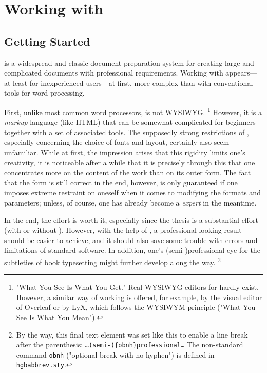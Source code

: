 \chapter{Working with \latex}
\label{cha:WorkingWithLatex}


\section{Getting Started}
\label{sec:LatexGettingStarted}

\latex is a widespread and classic document preparation system for creating
large and complicated documents with professional requirements. Working with
\latex appears---at least for inexperienced users---at first, more complex
than with conventional tools for word processing.

First, unlike most common word processors, \latex is not \textsc{WYSIWYG}.%
\footnote{"What You See Is What You Get." Real \textsc{WYSIWYG} editors for
\latex hardly exist. However, a similar way of working is offered, for example,
by the visual editor of \textsf{Overleaf} or by \textsf{LyX}, which follows the
\textsc{WYSIWYM} principle ("What You See Is What You Mean").}
However, it is a \emph{markup} language (like HTML) that can be somewhat
complicated for beginners together with a set of associated tools. The
supposedly strong restrictions of \latex, especially concerning the choice of
fonts and layout, certainly also seem unfamiliar. While at first, the impression
arises that this rigidity limits one's creativity, it is noticeable after a
while that it is precisely through this that one concentrates more on the
content of the work than on its outer form. The fact that the form is still
correct in the end, however, is only guaranteed if one imposes extreme
restraint on oneself when it comes to modifying the formats and parameters;
unless, of course, one has already become a \latex \emph{expert} in the
meantime.

In the end, the effort is worth it, especially since the thesis is a substantial
effort (with or without \latex). However, with the help of \latex, a
professional-looking result should be easier to achieve, and it should also save
some trouble with errors and limitations of standard software. In addition, one's
(semi-){\obnh}professional eye for the subtleties of book typesetting might
further develop along the way.%
\footnote{By the way, this final text element was set like this to enable a line
break after the parenthesis: \texttt{\ldots (semi-)\{{\bs}obnh\}professional\ldots}
The non-standard command \texttt{{\bs}obnh} ("optional break with no hyphen") is
defined in \texttt{hgbabbrev.sty}.}


